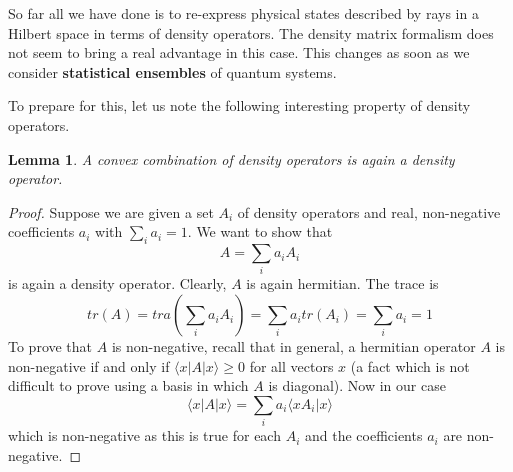 \documentclass[a4paper, draft]{article}
\theoremstyle{own}
\newtheorem{lem}[thm]{Lemma}
\theoremstyle{remark}
\begin{document}
So far all we have done is to re-express physical states described by rays in a Hilbert space in terms of density operators. The density matrix formalism does not seem to bring a real advantage in this case. This changes as soon as we consider {\bf statistical ensembles} of quantum systems. 

To prepare for this, let us note the following interesting property of density operators.

\begin{lem}
A convex combination of density operators is again a density operator.
\end{lem}

\begin{proof}
Suppose we are given a set $A_i$ of density operators and real, non-negative coefficients $a_i$ with $\sum_i a_i = 1$. We want to show that
$$
A = \sum_i a_i A_i
$$
is again a density operator. Clearly, $A$ is again hermitian. The trace is
$$
tr(A) = tra(\sum_i a_i A_i) = \sum_i a_i tr(A_i) = \sum_i a_i = 1
$$
To prove that $A$ is non-negative, recall that in general, a hermitian operator $A$ is non-negative if and only if $\langle x | A | x \rangle \geq 0$ for all vectors $x$ (a fact which is not difficult to prove using a basis in which $A$ is diagonal). Now in our case
$$
\langle x | A | x \rangle = \sum_i a_i \langle x A_i | x \rangle 
$$
which is non-negative as this is true for each $A_i$ and the coefficients $a_i$ are non-negative.
\end{proof}
\end{document}
